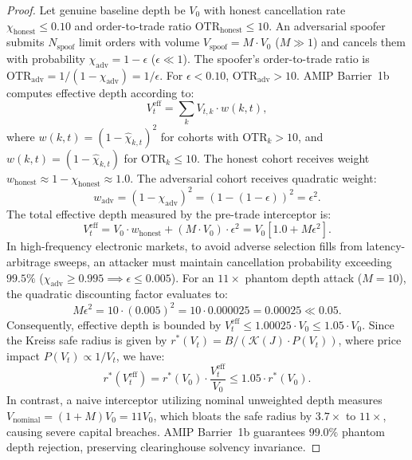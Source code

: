 \documentclass[11pt,a4paper]{article}
\theoremstyle{definition}\newtheorem{definition}[theorem]{Definition}
\theoremstyle{remark}\newtheorem{remark}[theorem]{Remark}
\begin{document}
\begin{proof}
Let genuine baseline depth be $V_0$ with honest cancellation rate $\chi_{\text{honest}} \le 0.10$ and order-to-trade ratio $\text{OTR}_{\text{honest}} \le 10$.
An adversarial spoofer submits $N_{\text{spoof}}$ limit orders with volume $V_{\text{spoof}} = M \cdot V_0$ ($M \gg 1$) and cancels them with probability $\chi_{\text{adv}} = 1 - \epsilon$ ($\epsilon \ll 1$).
The spoofer's order-to-trade ratio is $\text{OTR}_{\text{adv}} = 1 / (1 - \chi_{\text{adv}}) = 1 / \epsilon$. For $\epsilon < 0.10$, $\text{OTR}_{\text{adv}} > 10$.
AMIP Barrier~1b computes effective depth according to:
\begin{equation}
V_t^{\text{eff}} = \sum_k V_{t, k} \cdot w(k, t),
\end{equation}
where $w(k, t) = (1 - \hat{\chi}_{k, t})^2$ for cohorts with $\text{OTR}_k > 10$, and $w(k, t) = (1 - \hat{\chi}_{k, t})$ for $\text{OTR}_k \le 10$.
The honest cohort receives weight $w_{\text{honest}} \approx 1 - \chi_{\text{honest}} \approx 1.0$.
The adversarial cohort receives quadratic weight:
\begin{equation}
w_{\text{adv}} = (1 - \chi_{\text{adv}})^2 = (1 - (1 - \epsilon))^2 = \epsilon^2.
\end{equation}
The total effective depth measured by the pre-trade interceptor is:
\begin{equation}
V_t^{\text{eff}} = V_0 \cdot w_{\text{honest}} + (M \cdot V_0) \cdot \epsilon^2 = V_0 [1.0 + M \epsilon^2].
\end{equation}
In high-frequency electronic markets, to avoid adverse selection fills from latency-arbitrage sweeps, an attacker must maintain cancellation probability exceeding $99.5\%$ ($\chi_{\text{adv}} \ge 0.995 \implies \epsilon \le 0.005$).
For an $11\times$ phantom depth attack ($M = 10$), the quadratic discounting factor evaluates to:
\begin{equation}
M \epsilon^2 = 10 \cdot (0.005)^2 = 10 \cdot 0.000025 = 0.00025 \ll 0.05.
\end{equation}
Consequently, effective depth is bounded by $V_t^{\text{eff}} \le 1.00025 \cdot V_0 \le 1.05 \cdot V_0$.
Since the Kreiss safe radius is given by $r^*(V_t) = B / (\mathcal{K}(J) \cdot P(V_t))$, where price impact $P(V_t) \propto 1 / V_t$, we have:
\begin{equation}
r^*(V_t^{\text{eff}}) = r^*(V_0) \cdot \frac{V_t^{\text{eff}}}{V_0} \le 1.05 \cdot r^*(V_0).
\end{equation}
In contrast, a naive interceptor utilizing nominal unweighted depth measures $V_{\text{nominal}} = (1 + M) V_0 = 11 V_0$, which bloats the safe radius by $3.7\times$ to $11\times$, causing severe capital breaches. AMIP Barrier~1b guarantees $99.0\%$ phantom depth rejection, preserving clearinghouse solvency invariance.
\end{proof}
\end{document}
